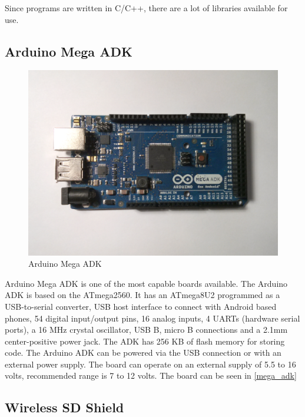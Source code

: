 Since programs are written in C/C++, there are a lot of libraries available for use. 

\subsection{Arduino Mega ADK}

\begin{figure}[h!]
\centering
\includegraphics[scale=0.53]{2/figures/mega_adk.pdf}
\caption{Arduino Mega ADK}
\label{mega_adk}
\end{figure}

Arduino Mega ADK \cite{megaAdk} is one of the most capable boards available. 
The Arduino ADK is based on the ATmega2560. It has an ATmega8U2 programmed as a USB-to-serial converter, USB host interface to connect with Android based phones, 54 digital input/output pins, 16 analog inputs, 4 UARTs (hardware serial ports), a 16 MHz crystal oscillator, USB B, micro B connections and a 2.1mm center-positive power jack. The ADK has 256 KB of flash memory for storing code. The Arduino ADK can be powered via the USB connection or with an external power supply. The board can operate on an external supply of 5.5 to 16 volts, recommended range is 7 to 12 volts. The board can be seen in \autoref{mega_adk}

\subsection{Wireless SD Shield}

